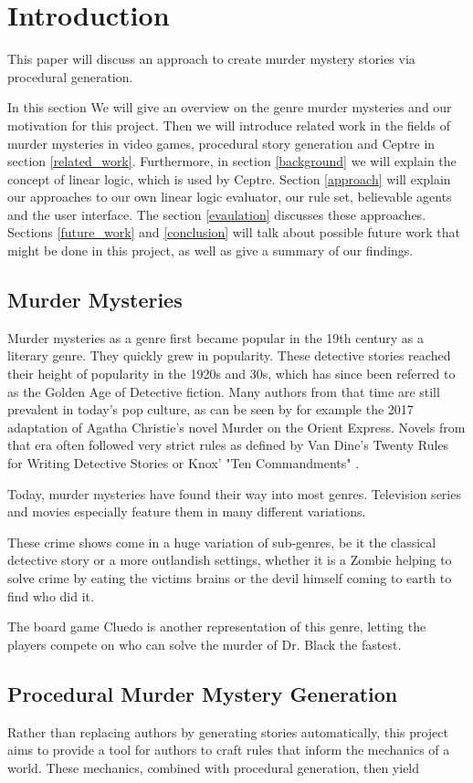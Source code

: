 \section{Introduction} \label{introduction}

This paper will discuss an approach to create murder mystery stories via procedural generation.

In this section We will give an overview on the genre murder mysteries and our motivation for this project.
Then we will introduce related work in the fields of murder mysteries in video games, procedural story generation and Ceptre in section \ref{related_work}.
Furthermore, in section \ref{background} we will explain the concept of linear logic, which is used by Ceptre.
Section \ref{approach} will explain our approaches to our own linear logic evaluator, our rule set, believable agents and the user interface.
The section \ref{evaulation} discusses these approaches.
Sections \ref{future_work} and \ref{conclusion} will talk about possible future work that might be done in this project, as well as give a summary of our findings. 

\subsection{Murder Mysteries}

Murder mysteries as a genre first became popular in the 19th century as a literary genre.
They quickly grew in popularity.
These detective stories reached their height of popularity in the 1920s and 30s, which has since been referred to as the Golden Age of Detective fiction.
Many authors from that time are still prevalent in today's pop culture, as can be seen by for example the 2017 adaptation of Agatha Christie's novel Murder on the Orient Express.
Novels from that era often followed very strict rules as defined by Van Dine's Twenty Rules for Writing Detective Stories \cite{van_dine_1928} or Knox' "Ten Commandments" \cite{knox_1929}.

Today, murder mysteries have found their way into most genres.
Television series and movies especially feature them in many different variations.

These crime shows come in a huge variation of sub-genres, be it the classical detective story or a more outlandish settings, whether it is a Zombie helping to solve crime by eating the victims brains or the devil himself coming to earth to find who did it. 

The board game Cluedo is another representation of this genre, letting the players compete on who can solve the murder of Dr. Black the fastest.

\subsection{Procedural Murder Mystery Generation} 
Rather than replacing authors by generating stories automatically, this project aims to provide a tool for authors to craft rules that inform the mechanics of a world.
These mechanics, combined with procedural generation, then yield 